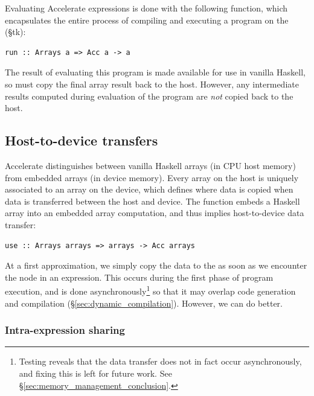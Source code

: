 Evaluating Accelerate expressions is done with the following function, which
encapsulates the entire process of compiling and executing a program on the
\GPU (\S tk):
%
\begin{lstlisting}[style=haskell,numbers=none]
    run :: Arrays a => Acc a -> a
\end{lstlisting}
%
The result of evaluating this program is made available for use in vanilla
Haskell, so  must copy the final array result back to the host.
However, any intermediate results computed during evaluation of the program are
\emph{not} copied back to the host.


\subsection{Host-to-device transfers}
\label{sec:host_device_transfers}

Accelerate distinguishes between vanilla Haskell arrays (in CPU host memory)
from embedded arrays (in \GPU device memory). Every array on the host is
uniquely associated to an array on the device, which defines where data is
copied when data is transferred between the host and device. The function
 embeds a Haskell array into an embedded array computation, and thus
implies host-to-device data transfer:
%
\begin{lstlisting}[style=haskell,numbers=none]
    use :: Arrays arrays => arrays -> Acc arrays
\end{lstlisting}
%

At a first approximation, we simply copy the data to the \GPU as soon as we
encounter the  node in an expression. This occurs during the first
phase of program execution, and is done asynchronously\footnote{Testing reveals
that the data transfer does not in fact occur asynchronously, and fixing this is
left for future work. See \S\ref{sec:memory_management_conclusion}.}
so that it may overlap code generation and compilation
(\S\ref{sec:dynamic_compilation}). However, we can do better.

\subsubsection{Intra-expression sharing}

